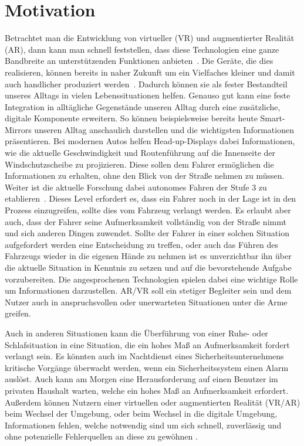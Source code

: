 \section{Motivation}\label{sec:motivation}

Betrachtet man die Entwicklung von virtueller (VR) und augmentierter Realität (AR), dann kann man schnell feststellen, dass diese Technologien eine ganze Bandbreite an unterstützenden Funktionen anbieten~\cite{hughes2005mixed,medenica2011augmented,hayhurst2018augmented}. Die Geräte, die dies realisieren, können bereits in naher Zukunft um ein Vielfaches kleiner und damit auch handlicher produziert werden~\cite{shibata2002head}. Dadurch können sie als fester Bestandteil unseres Alltags in vielen Lebenssituationen helfen.
Genauso gut kann eine feste Integration in alltägliche Gegenstände unseren Alltag durch eine zusätzliche, digitale Komponente erweitern. So können beispielsweise bereits heute Smart-Mirrors unseren Alltag anschaulich darstellen und die wichtigsten Informationen präsentieren. 
Bei modernen Autos helfen Head-up-Displays dabei Informationen, wie die aktuelle Geschwindigkeit und Routenführung auf die Innenseite der Windschutzscheibe zu projizieren. Diese sollen dem Fahrer ermöglichen die Informationen zu erhalten, ohne den Blick von der Straße nehmen zu müssen.
Weiter ist die aktuelle Forschung dabei autonomes Fahren der Stufe 3 zu etablieren~\cite{rodel2014towards}. Dieses Level erfordert es, dass ein Fahrer noch in der Lage ist in den Prozess einzugreifen, sollte dies vom Fahrzeug verlangt werden. Es erlaubt aber auch, dass der Fahrer seine Aufmerksamkeit vollständig von der Straße nimmt und sich anderen Dingen zuwendet.
Sollte der Fahrer in einer solchen Situation aufgefordert werden eine Entscheidung zu treffen, oder auch das Führen des Fahrzeugs wieder in die eigenen Hände zu nehmen ist es unverzichtbar ihn über die aktuelle Situation in Kenntnis zu setzen und auf die bevorstehende Aufgabe vorzubereiten. 
Die angesprochenen Technologien spielen dabei eine wichtige Rolle um Informationen darzustellen. AR/VR soll ein stetiger Begleiter sein und dem Nutzer auch in anspruchsvollen oder unerwarteten Situationen unter die Arme greifen.

Auch in anderen Situationen kann die Überführung von einer Ruhe- oder Schlafsituation in eine Situation, die ein hohes Maß an Aufmerksamkeit fordert verlangt sein. Es könnten auch im Nachtdienst eines Sicherheitsunternehmens kritische Vorgänge überwacht werden, wenn ein Sicherheitssystem einen Alarm auslöst. Auch kann am Morgen eine Herausforderung auf einen Benutzer im privaten Haushalt warten, welche ein hohes Maß an Aufmerksamkeit erfordert. 
Außerdem können Nutzern einer virtuellen oder augmentierten Realität (VR/AR) beim Wechsel der Umgebung, oder beim Wechsel in die digitale Umgebung, Informationen fehlen, welche notwendig sind um sich schnell, zuverlässig und ohne potenzielle Fehlerquellen an diese zu gewöhnen \cite{knibbe2018dream}.

